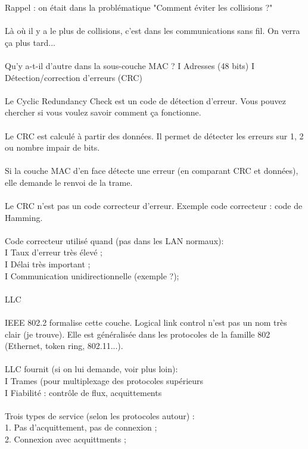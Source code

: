 \documentclass[5pt]{article}
\begin{document}
\begin{scriptsize}
Rappel : on était dans la problématique "Comment éviter les collisions ?"\\
\\
Là où il y a le plus de collisions, c’est dans les communications sans fil. On verra ça plus tard...\\
\\
Qu’y a-t-il d’autre dans la sous-couche MAC ? I Adresses (48 bits) I Détection/correction d’erreurs (CRC)\\
\\
Le Cyclic Redundancy Check est un code de détection d’erreur. Vous pouvez chercher si vous voulez savoir comment ça fonctionne.\\
\\
Le CRC est calculé à partir des données. Il permet de détecter les erreurs sur 1, 2 ou nombre impair de bits.\\
\\
Si la couche MAC d’en face détecte une erreur (en comparant CRC et données), elle demande le renvoi de la trame.\\
\\
Le CRC n’est pas un code correcteur d’erreur. Exemple code correcteur : code de Hamming.\\
\\
Code correcteur utilisé quand (pas dans les LAN normaux):\\
I Taux d’erreur très élevé ;\\
I Délai très important ;\\
I Communication unidirectionnelle (exemple ?);\\
\\
LLC\\
\\
IEEE 802.2 formalise cette couche. Logical link control n’est pas un nom très clair (je trouve). Elle est généralisée dans les protocoles de la famille 802 (Ethernet, token ring, 802.11...).\\
\\
LLC fournit (si on lui demande, voir plus loin):\\
I Trames (pour multiplexage des protocoles supérieurs\\
I Fiabilité : contrôle de flux, acquittements\\
\\
Trois types de service (selon les protocoles autour) :\\
1. Pas d’acquittement, pas de connexion ;\\
2. Connexion avec acquittments ;\\

\end{scriptsize}
\end{document}
